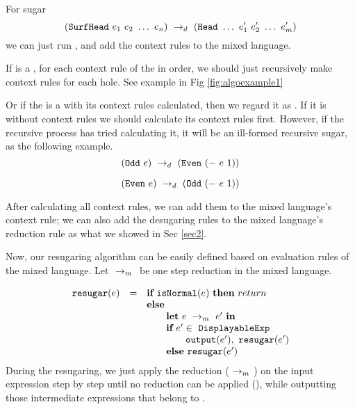 For sugar 
\[
(\mbox{\tt SurfHead}~e_1~e_2~\ldots~e_n) ~\rightarrow_d~ (\mbox{\tt Head}~\ldots~e_1'~e_2'~\ldots~e_m')
\]
we can just run , and add the context rules to the mixed language.


If  is a , for each context rule of the  in order, we should just recursively make context rules for each hole. See example in Fig \ref{fig:algoexample1}

Or if the  is a  with its context rules calculated, then we regard it as . If it is without context rules we should calculate its context rules first. However, if the recursive process has tried calculating it, it will be an ill-formed recursive sugar, as the following example.
\[
(\mbox{\tt Odd}~e) ~\rightarrow_d~ (\mbox{\tt Even}~(-~e~1))
\]

\[
(\mbox{\tt Even}~e) ~\rightarrow_d~ (\mbox{\tt Odd}~(-~e~1))
\]

After calculating all context rules, we can add them to the mixed language's context rule; we can also add the desugaring rules to the mixed language's reduction rule as what we showed in Sec \ref{sec2}.


Now, our resugaring algorithm can be easily defined based on evaluation rules of the mixed language. Let $~\rightarrow_m~$ be one step reduction in the mixed language.

\[
\begin{array}{llll}
\mbox{\tt resugar} (e) &=& \mbox{\rm \bf if}~\mbox{\tt isNormal}(e)~\mbox{\rm \bf then}~return\\
              & & \mbox{\rm \bf else}~\\
							& & \qquad \mbox{\rm \bf let}~e ~\rightarrow_m~e'~\mbox{\rm \bf in}\\
							& & \qquad \mbox{\rm \bf if}~e' \in~\mbox{\tt DisplayableExp} \\
							& & \qquad \qquad \mbox{\tt output}(e'),~\mbox{\tt resugar}(e')\\
							& & \qquad \mbox{\rm \bf else}~\mbox{\tt resugar}(e')
\end{array}
\]
During the resugaring, we just apply the reduction ($~\rightarrow_m~$) on the input expression step by step until no reduction can be applied (), while outputting those intermediate expressions that belong to .


